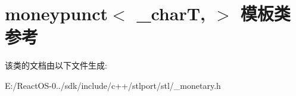\hypertarget{classmoneypunct}{}\section{moneypunct$<$ \+\_\+charT, $>$ 模板类 参考}
\label{classmoneypunct}


该类的文档由以下文件生成\+:\begin{DoxyCompactItemize}
\item 
E\+:/\+React\+O\+S-\/0../sdk/include/c++/stlport/stl/\+\_\+monetary.\+h\end{DoxyCompactItemize}
